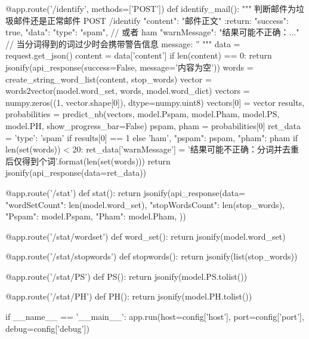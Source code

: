 \documentclass[UTF8,zihao=-4]{ctexart}
\begin{document}
\begin{python}
@app.route('/identify', methods=['POST'])
def identify_mail():
    """
    判断邮件为垃圾邮件还是正常邮件
    POST /identify
    {
        "content": "邮件正文"
    }
    :return:
    {
        "success": true,
        "data": {
            "type": "spam",  // 或者 ham
            "warnMessage": "结果可能不正确：..."  // 当分词得到的词过少时会携带警告信息
        }
        message: ''
    }
    """
    data = request.get_json()
    content = data['content']
    if len(content) == 0:
        return jsonify(api_response(success=False, message='内容为空'))
    words = create_string_word_list(content, stop_words)
    vector = words2vector(model.word_set, words, model.word_dict)
    vectors = numpy.zeros((1, vector.shape[0]), dtype=numpy.uint8)
    vectors[0] = vector
    results, probabilities = predict_nb(vectors, model.Pspam, model.Pham, model.PS, model.PH, show_progress_bar=False)
    pspam, pham = probabilities[0]
    ret_data = {'type': 'spam' if results[0] == 1 else 'ham', "pspam": pspam, "pham": pham}
    if len(set(words)) < 20:
        ret_data['warnMessage'] = '结果可能不正确：分词并去重后仅得到{}个词'.format(len(set(words)))
    return jsonify(api_response(data=ret_data))


@app.route('/stat')
def stat():
    return jsonify(api_response(data={
        "wordSetCount": len(model.word_set),
        "stopWordsCount": len(stop_words),
        "Pspam": model.Pspam,
        "Pham": model.Pham,
    }))


@app.route('/stat/wordset')
def word_set():
    return jsonify(model.word_set)


@app.route('/stat/stopwords')
def stopwords():
    return jsonify(list(stop_words))


@app.route('/stat/PS')
def PS():
    return jsonify(model.PS.tolist())


@app.route('/stat/PH')
def PH():
    return jsonify(model.PH.tolist())


if __name__ == '__main__':
    app.run(host=config['host'], port=config['port'], debug=config['debug'])
\end{python}
\end{document}
